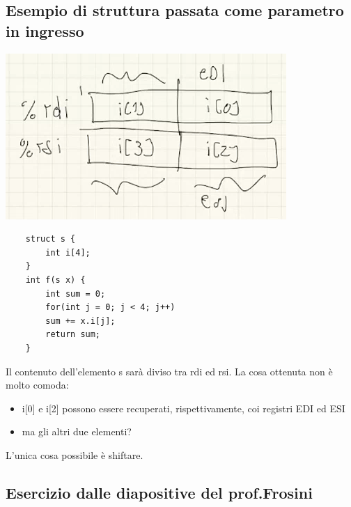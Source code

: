 \subsection{Esempio di struttura passata come parametro in ingresso}
\begin{center}\includegraphics[scale=0.85]{img/22.PNG}\end{center}
\begin{verbatim}
	struct s {
		int i[4];
	}
	int f(s x) {
		int sum = 0;
		for(int j = 0; j < 4; j++)
		sum += x.i[j];
		return sum;
	}
\end{verbatim}
Il contenuto dell'elemento s sarà diviso tra rdi ed rsi. La cosa ottenuta non è molto comoda:
\begin{itemize}
	\item i[0] e i[2] possono essere recuperati, rispettivamente, coi registri EDI ed ESI
	\item ma gli altri due elementi?
\end{itemize}
L'unica cosa possibile è shiftare.


\subsection{Esercizio dalle diapositive del prof.Frosini}
\begingroup
\small
